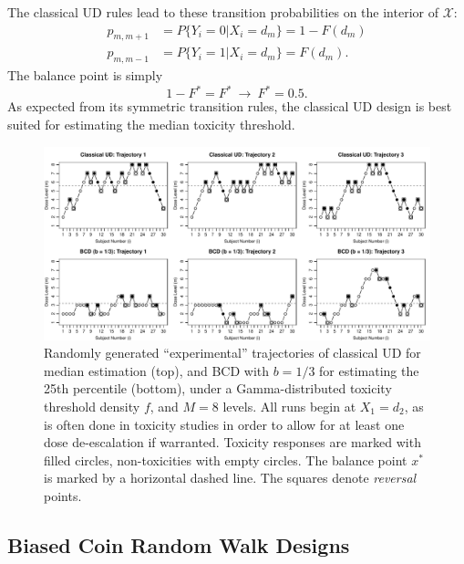 The classical UD rules lead to these transition probabilities on the interior of $\mathcal{X}$:
\begin{equation}
\begin{array}{rl}
p_{m,m+1}&=P\{Y_i=0|X_i=d_m\}=1-F(d_m)\\
p_{m,m-1}&=P\{Y_i=1|X_i=d_m\}=F(d_m).
\end{array}
\end{equation}
The balance point is simply
\begin{equation*}
1-F^*=F^*\ \longrightarrow \   F^*=0.5.
\end{equation*}
As expected from its symmetric transition rules, the classical UD design is best suited for estimating the median toxicity threshold.

\begin{figure}
\begin{center}
\includegraphics[scale=0.65]{Traject2}
\caption{Randomly generated ``experimental'' trajectories of classical UD for median estimation (top), and BCD with $b=1/3$ for estimating the 25th percentile (bottom), under a Gamma-distributed toxicity threshold density $f$, and $M=8$ levels. All runs begin at $X_1=d_2$, as is often done in toxicity studies in order to allow for at least one dose de-escalation if warranted. Toxicity responses are marked with filled circles, non-toxicities with empty circles. The balance point $x^*$ is marked by a horizontal dashed line. The squares denote \emph{reversal} points.}\label{fig:traject}
\end{center}
\end{figure}

\subsection{Biased Coin Random Walk Designs}

